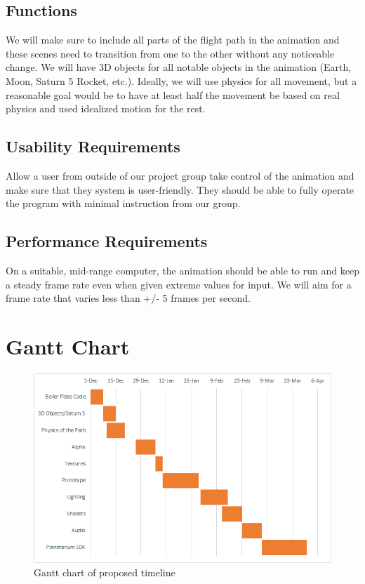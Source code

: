 \documentclass[onecolumn, draftclsnofoot,10pt, compsoc]{IEEEtran}
\begin{document}
    \subsection{Functions}
    We will make sure to include all parts of the flight path in the animation and these scenes need to transition from one to the other without any noticeable change. We will have 3D objects for all notable objects in the animation (Earth, Moon, Saturn 5 Rocket, etc.). Ideally, we will use physics for all movement, but a reasonable goal would be to have at least half the movement be based on real physics and used idealized motion for the rest.
    \subsection{Usability Requirements}
    Allow a user from outside of our project group take control of the animation and make sure that they system is user-friendly. They 
    should be able to fully operate the program with minimal instruction from our group. 
    \subsection{Performance Requirements}
    On a suitable, mid-range computer, the animation should be able to run and keep a steady frame rate even when given extreme values for input. We will aim for a frame rate that varies less than +/- 5 frames per second.

\newpage

\section{Gantt Chart}

\begin{figure}[!htb]
    \includegraphics[width=\linewidth]{Gantt.png}
    \caption{Gantt chart of proposed timeline}
    \label{fig:Gantt Chart}
\end{figure}
\end{document}
